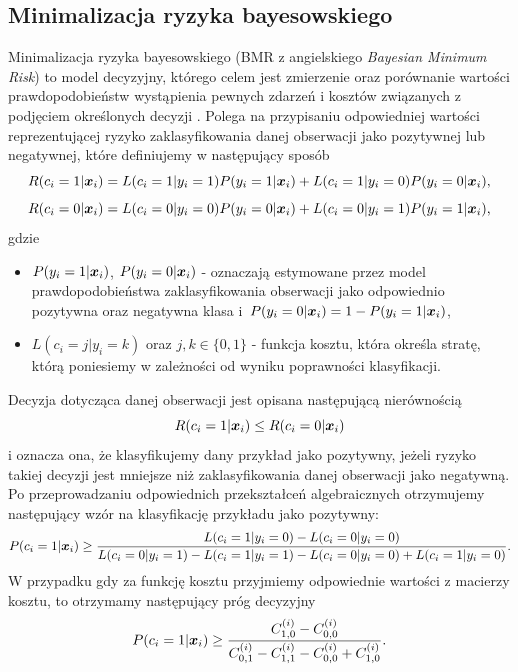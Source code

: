 \documentclass[inzynierska]{pwr_wmat_praca_dyplomowa}
\theoremstyle{plain}
\numberwithin{theorem}{chapter}
\theoremstyle{definition}
\numberwithin{theorem}{chapter}
\begin{document}
\subsection{Minimalizacja ryzyka bayesowskiego}
Minimalizacja ryzyka bayesowskiego (BMR z angielskiego \textit{Bayesian Minimum Risk}) to model decyzyjny, którego celem jest zmierzenie oraz porównanie wartości prawdopodobieństw wystąpienia pewnych zdarzeń i kosztów związanych z podjęciem określonych decyzji  \cite{CSCCFD}. Polega na przypisaniu odpowiedniej wartości reprezentującej ryzyko zaklasyfikowania danej obserwacji jako pozytywnej lub negatywnej, które definiujemy w następujący sposób
$$ R(c_i = 1|\boldsymbol{x}_{i}) = L(c_i = 1|y_i = 1)P(y_i = 1|\boldsymbol{x}_{i}) + L(c_i = 1|y_i = 0)P(y_i = 0|\boldsymbol{x}_{i}) \text{,}$$
$$ R(c_i = 0|\boldsymbol{x}_{i}) = L(c_i = 0|y_i = 0)P(y_i = 0|\boldsymbol{x}_{i}) + L(c_i = 0|y_i = 1)P(y_i = 1|\boldsymbol{x}_{i}) \text{,}$$
gdzie
\begin{itemize}
	\item $P(y_i = 1|\boldsymbol{x}_{i})$, $P(y_i = 0|\boldsymbol{x}_{i})$ - oznaczają estymowane przez model prawdopodobieństwa zaklasyfikowania obserwacji jako odpowiednio pozytywna oraz negatywna klasa i~$P(y_i = 0|\boldsymbol{x}_{i}) = 1 - P(y_i = 1|\boldsymbol{x}_{i})$,
	\item $L(c_i = j|y_i = k)$ oraz $j,k \in \{0, 1\}$ - funkcja kosztu, która określa stratę, którą poniesiemy w zależności od wyniku poprawności klasyfikacji.
\end{itemize}{}
Decyzja dotycząca danej obserwacji jest opisana następującą nierównością
$$ R(c_i = 1|\boldsymbol{x}_{i}) \leq R(c_i = 0|\boldsymbol{x}_{i})$$
i oznacza ona, że klasyfikujemy dany przykład jako pozytywny, jeżeli ryzyko takiej decyzji jest mniejsze niż zaklasyfikowania danej obserwacji jako negatywną. 
Po przeprowadzaniu odpowiednich przekształceń algebraicznych otrzymujemy następujący wzór na klasyfikację przykładu jako pozytywny:
$$ P(c_i = 1|\boldsymbol{x}_{i}) \ge \frac{L(c_i = 1|y_i = 0) - L(c_i = 0|y_i = 0)}{L(c_i = 0|y_i = 1) - L(c_i = 1|y_i = 1) - L(c_i = 0|y_i = 0) + L(c_i = 1|y_i = 0)} \text{.}$$
W przypadku gdy za funkcję kosztu przyjmiemy odpowiednie wartości z macierzy kosztu, to otrzymamy następujący próg decyzyjny
$$ P(c_i = 1|\boldsymbol{x}_{i}) \ge \frac{C^{(i)}_{1,0} - C^{(i)}_{0,0}}{C^{(i)}_{0,1} - C^{(i)}_{1,1} - C^{(i)}_{0,0} + C^{(i)}_{1,0}} \text{.}$$
\end{document}
